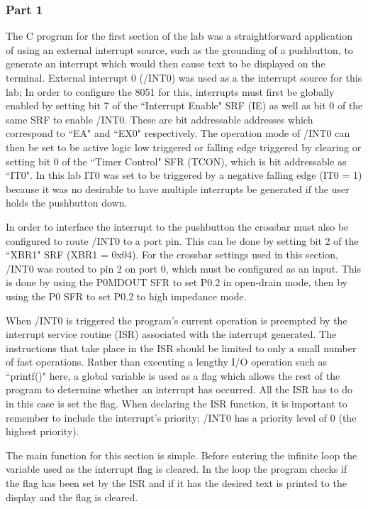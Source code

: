 \documentclass[12pt]{article}
\begin{document}
\subsubsection{Part 1}
The C program for the first section of the lab was a straightforward application of using an external interrupt source, such as the grounding of a pushbutton, to generate an interrupt which would then cause text to be displayed on the terminal. External interrupt 0 (/INT0) was used as a the interrupt source for this lab; In order to configure the 8051 for this, interrupts must first be globally enabled by setting bit 7 of the ``Interrupt Enable" SRF (IE) as well as bit 0 of the same SRF to enable /INT0. These are bit addressable addresses which correspond to ``EA" and ``EX0" respectively. The operation mode of /INT0 can then be set to be active logic low triggered or falling edge triggered by clearing or setting bit 0 of the ``Timer Control" SFR (TCON), which is bit addressable as ``IT0". In this lab IT0 was set to be triggered by a negative falling edge (IT0 = 1) because it was no desirable to have multiple interrupts be generated if the user holds the pushbutton down. 

In order to interface the interrupt to the pushbutton the crossbar must also be configured to route /INT0 to a port pin. This can be done by setting bit 2 of the ``XBR1" SRF (XBR1 = 0x04). For the crossbar settings used in this section, /INT0 was routed to pin 2 on port 0, which must be configured as an input. This is done by using the P0MDOUT SFR to set P0.2 in open-drain mode, then by using the P0 SFR to set P0.2 to high impedance mode.  

When /INT0 is triggered the program's current operation is preempted by the interrupt service routine (ISR) associated with the interrupt generated. The instructions that take place in the ISR should be limited to only a small number of fast operations. Rather than executing a lengthy I/O operation such as ``printf()" here, a global variable is used as a flag which allows the rest of the program to determine whether an interrupt has occurred. All the ISR has to do in this case is set the flag. When declaring the ISR function, it is important to remember to include the interrupt's priority; /INT0 has a priority level of 0 (the highest priority).

The main function for this section is simple. Before entering the infinite loop the variable used as the interrupt flag is cleared. In the loop the program checks if the flag has been set by the ISR and if it has the desired text is printed to the display and the flag is cleared.
\end{document}
